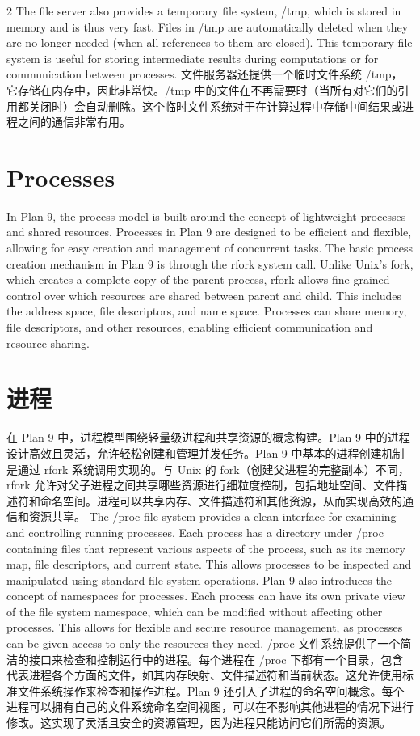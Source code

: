 \documentclass{article}
\begin{document}
\begin{paracol}{2}
\switchcolumn*
The file server also provides a temporary file system, /tmp, which is stored in memory and is thus very fast. Files in /tmp are automatically deleted when they are no longer needed (when all references to them are closed). This temporary file system is useful for storing intermediate results during computations or for communication between processes.
\switchcolumn
文件服务器还提供一个临时文件系统 /tmp，它存储在内存中，因此非常快。/tmp 中的文件在不再需要时（当所有对它们的引用都关闭时）会自动删除。这个临时文件系统对于在计算过程中存储中间结果或进程之间的通信非常有用。
\switchcolumn*
\section*{Processes}
In Plan 9, the process model is built around the concept of lightweight processes and shared resources. Processes in Plan 9 are designed to be efficient and flexible, allowing for easy creation and management of concurrent tasks. The basic process creation mechanism in Plan 9 is through the rfork system call. Unlike Unix's fork, which creates a complete copy of the parent process, rfork allows fine-grained control over which resources are shared between parent and child. This includes the address space, file descriptors, and name space. Processes can share memory, file descriptors, and other resources, enabling efficient communication and resource sharing.
\switchcolumn
\section*{进程}
在 Plan 9 中，进程模型围绕轻量级进程和共享资源的概念构建。Plan 9 中的进程设计高效且灵活，允许轻松创建和管理并发任务。Plan 9 中基本的进程创建机制是通过 rfork 系统调用实现的。与 Unix 的 fork（创建父进程的完整副本）不同，rfork 允许对父子进程之间共享哪些资源进行细粒度控制，包括地址空间、文件描述符和命名空间。进程可以共享内存、文件描述符和其他资源，从而实现高效的通信和资源共享。
\switchcolumn*
The /proc file system provides a clean interface for examining and controlling running processes. Each process has a directory under /proc containing files that represent various aspects of the process, such as its memory map, file descriptors, and current state. This allows processes to be inspected and manipulated using standard file system operations. Plan 9 also introduces the concept of namespaces for processes. Each process can have its own private view of the file system namespace, which can be modified without affecting other processes. This allows for flexible and secure resource management, as processes can be given access to only the resources they need.
\switchcolumn
/proc 文件系统提供了一个简洁的接口来检查和控制运行中的进程。每个进程在 /proc 下都有一个目录，包含代表进程各个方面的文件，如其内存映射、文件描述符和当前状态。这允许使用标准文件系统操作来检查和操作进程。Plan 9 还引入了进程的命名空间概念。每个进程可以拥有自己的文件系统命名空间视图，可以在不影响其他进程的情况下进行修改。这实现了灵活且安全的资源管理，因为进程只能访问它们所需的资源。
\switchcolumn*

\end{paracol}
\end{document}
